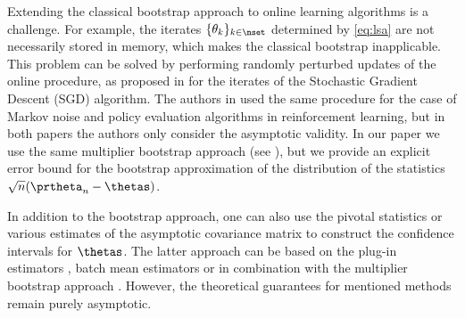 \par 
Extending the classical bootstrap approach to online learning algorithms is a challenge. For example, the iterates $\{\theta_k\}_{k \in \nset}$ determined by \eqref{eq:lsa} are not necessarily stored in memory, which makes the classical bootstrap inapplicable. This problem can be solved by performing randomly perturbed updates of the online procedure, as proposed in \cite{JMLR:v19:17-370} for the iterates of the Stochastic Gradient Descent (SGD) algorithm. The authors in \cite{JASA2023} used the same procedure for the case of Markov noise and policy evaluation algorithms in reinforcement learning, but in both papers the authors only consider the asymptotic validity. In our paper we use the same multiplier bootstrap approach (see ), but we provide an explicit error bound for the bootstrap approximation of the distribution of the statistics $\sqrt{n}(\prtheta_{n} - \thetas)$. 
\par 
In addition to the bootstrap approach, one can also use the pivotal statistics \cite{LEE2024105673,li2023online,li2023statistical} or various estimates of the asymptotic covariance matrix \cite{zhu2023online_cov_matr} to construct the confidence intervals for $\thetas$. The latter approach can be based on the plug-in estimators \cite{pmlr-v178-li22b}, batch mean estimators \cite{chen2020aos} or in combination with the multiplier bootstrap approach \cite{zhong2023online}. However, the theoretical guarantees for mentioned methods remain purely asymptotic.
